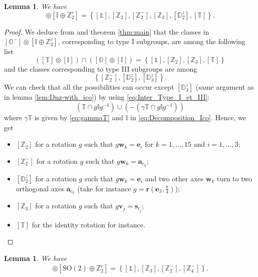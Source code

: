 \documentclass[11pt,a4paper]{amsart}
\newtheorem{lem}[thm]{Lemma}
\theoremstyle{definition}
\newcommand{\ZZ}{\mathbb{Z}}                %
\newcommand{\SO}{\mathrm{SO}}               %
\newcommand{\octa}{\mathbb{O}}              %
\newcommand{\ico}{\mathbb{I}}               %
\newcommand{\tetra}{\mathbb{T}}             %
\newcommand{\DD}{\mathbb{D}}                %
\newcommand{\1}{\mathds{1}}		            %
\newcommand{\ee}{\pmb{e}}                   %
\newcommand{\vv}{\pmb{v}}                   %
\newcommand{\vR}{\mathbf{r}}
\newcommand{\set}[1]{\left\{#1\right\}}     %
\begin{document}
\begin{lem}
	We have
	\begin{equation*}
		[\octa^-] \circledcirc
		[\ico \oplus \ZZ_2^c]=\set{[\1],[\ZZ_2],[\ZZ_2^-],[\ZZ_3],[\DD_2^z],[\tetra]}.
	\end{equation*}
\end{lem}


\begin{proof}
	We deduce from \cite[table 1]{Olive2019} and theorem \ref{thm:main} that the classes in $[\octa^-]\circledcirc [\ico\oplus \ZZ_2^c]$, corresponding to type I subgroups, are among the following list
	\begin{equation*}
		([\tetra]\circledcirc [\ico])\cap ([\octa]\circledcirc[\ico])=\set{[\1],[\ZZ_{2}],[\ZZ_3],[\tetra]}
	\end{equation*}
	and the classes corresponding to type III subgroups are among
	\begin{equation*}
		\set{[\ZZ_2^-],[\DD_{2}^z] ,[\DD_{3}^z]}.
	\end{equation*}
	We can check that all the possibilities can occur except $[\DD_3^z]$ (same argument as in lemma \ref{lem:Dnz-with_ico}) by using \eqref{eq:Inter_Type_I_et_III}:
	\begin{equation*}
		(\tetra\cap g \ico g^{-1})\cup (-(\gamma\tetra\cap g \ico g^{-1}))
	\end{equation*}
	where  $ \gamma\tetra$ is given by \eqref{eq:gammaT} and $\ico$ in \eqref{eq:Decomposition_Ico}. Hence, we get
	\begin{itemize}
		
		\item $[\ZZ_2]$ for a rotation $g$ such that $g\pmb{w}_{k}=\ee_i$ for $k=1,\dotsc, 15$ and $i=1,\dotsc,3$;
		\item $[\ZZ_{2}^-]$ for a rotation $g$ such that $g\pmb{w}_{k}= \pmb{a}_{c_k}$;
		\item $[\DD_{2}^z]$ for a rotation $g$ such that $g\pmb{w}_{k}= \ee_i$ and two other axes $\pmb{w}_{k}$ turn to two orthogonal axes $ \pmb{a}_{c_k}$ (take for instance $g=\vR\left(\ee_3,\frac{\pi}{4}\right)$);
		\item $[\ZZ_{3}]$ for a rotation $g$ such that $g\vv_{j}=\pmb{s}_{t_j}$;
		\item $[\tetra]$ for the identity rotation for instance.
	\end{itemize}
\end{proof}



\begin{lem}
  We have
  \begin{align*}
      [\octa^-] \circledcirc
    [\SO(2) \oplus \ZZ_2^c]=\set{[\1],[\ZZ_3],[\ZZ_2^-],[\ZZ_4^-]}.
  \end{align*}
\end{lem}
\end{document}
